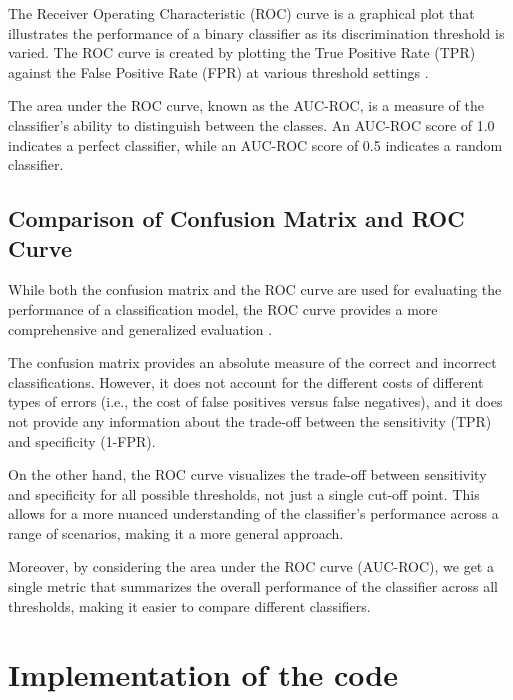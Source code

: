 \documentclass{cernatsnote}
\begin{document}
The Receiver Operating Characteristic (ROC) curve is a graphical plot that illustrates the performance of a binary classifier as its discrimination threshold is varied. The ROC curve is created by plotting the True Positive Rate (TPR) against the False Positive Rate (FPR) at various threshold settings \cite{fawcett2006introduction, powers2011evaluation}.

The area under the ROC curve, known as the AUC-ROC, is a measure of the classifier's ability to distinguish between the classes. An AUC-ROC score of 1.0 indicates a perfect classifier, while an AUC-ROC score of 0.5 indicates a random classifier.

\subsection{Comparison of Confusion Matrix and ROC Curve}

While both the confusion matrix and the ROC curve are used for evaluating the performance of a classification model, the ROC curve provides a more comprehensive and generalized evaluation \cite{powers2011evaluation}.

The confusion matrix provides an absolute measure of the correct and incorrect classifications. However, it does not account for the different costs of different types of errors (i.e., the cost of false positives versus false negatives), and it does not provide any information about the trade-off between the sensitivity (TPR) and specificity (1-FPR).

On the other hand, the ROC curve visualizes the trade-off between sensitivity and specificity for all possible thresholds, not just a single cut-off point. This allows for a more nuanced understanding of the classifier's performance across a range of scenarios, making it a more general approach.

Moreover, by considering the area under the ROC curve (AUC-ROC), we get a single metric that summarizes the overall performance of the classifier across all thresholds, making it easier to compare different classifiers.












\section{Implementation of the code}
\end{document}
